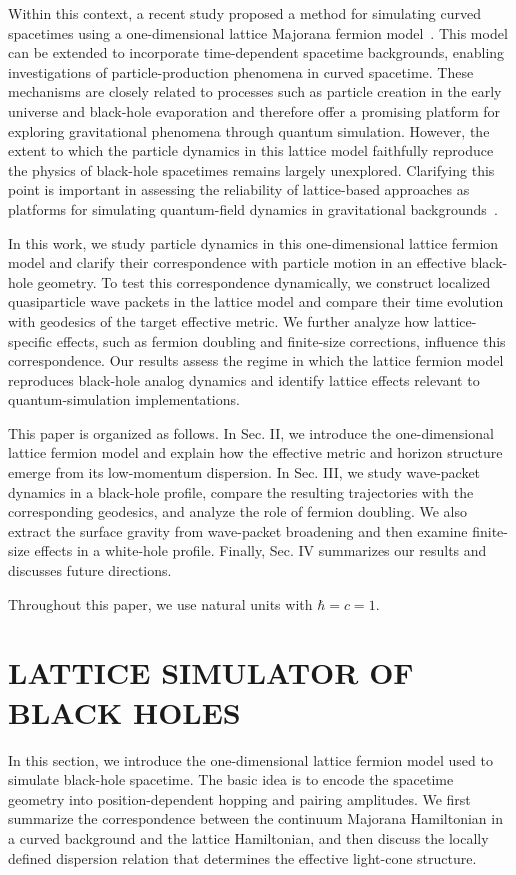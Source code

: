 \documentclass[reprint,amsmath,amssymb,aps,prb,showkeys]{revtex4-2}
\begin{document}
Within this context, a recent study proposed a method for simulating curved spacetimes using a one-dimensional lattice Majorana fermion model~\cite{PhysRevResearch.7.023197,s3qb-n94w,kinoshita2026simulatingquantumfieldtheories}. This model can be extended to incorporate time-dependent spacetime backgrounds, enabling investigations of particle-production phenomena in curved spacetime. These mechanisms are closely related to processes such as particle creation in the early universe and black-hole evaporation and therefore offer a promising platform for exploring gravitational phenomena through quantum simulation. However, the extent to which the particle dynamics in this lattice model faithfully reproduce the physics of black-hole spacetimes remains largely unexplored. Clarifying this point is important in assessing the reliability of lattice-based approaches as platforms for simulating quantum-field dynamics in gravitational backgrounds~\cite{PhysRevResearch.4.033237,Morice:2021ynm,10.21468/SciPostPhys.14.5.119}.

In this work, we study particle dynamics in this one-dimensional lattice fermion model and clarify their correspondence with particle motion in an effective black-hole geometry.
To test this correspondence dynamically, we construct localized
quasiparticle wave packets in the lattice model and compare their
time evolution with geodesics of the target effective metric.
We further analyze how lattice-specific effects, such as fermion doubling and finite-size corrections, influence this correspondence.
Our results assess the regime in which the lattice fermion model reproduces black-hole analog dynamics and identify lattice effects relevant to quantum-simulation implementations.

This paper is organized as follows. In Sec. II, we introduce the one-dimensional lattice fermion model and explain how the effective metric and horizon structure emerge from its low-momentum dispersion. In Sec. III, we study wave-packet dynamics in a black-hole profile, compare the resulting trajectories with the corresponding geodesics, and analyze the role of fermion doubling. We also extract the surface gravity from wave-packet broadening and then examine finite-size effects in a white-hole profile. Finally, Sec. IV summarizes our results and discusses future directions.

Throughout this paper, we use natural units with $\hbar=c=1$.

\section{LATTICE SIMULATOR OF
BLACK HOLES}
In this section, we introduce the one-dimensional lattice fermion model used to simulate black-hole spacetime.
The basic idea is to encode the spacetime geometry into position-dependent hopping and pairing amplitudes.
We first summarize the correspondence between the continuum Majorana Hamiltonian in a curved background and the lattice Hamiltonian, and then discuss the locally defined dispersion relation that determines the effective light-cone structure.
\end{document}
